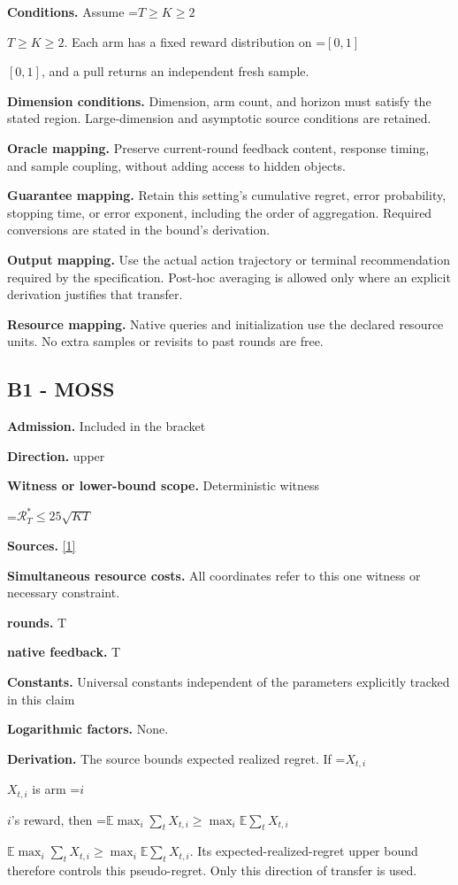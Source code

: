 \documentclass[10pt,a4paper]{article}
\newcommand{\AtlasMath}[1]{\par\begingroup\centering\setbox0=\hbox{$\displaystyle #1$}\ifdim\wd0>1.4\linewidth\typeout{ATLAS WIDE FORMULA: \the\wd0}\fi\ifdim\wd0>\linewidth\resizebox{\linewidth}{!}{\box0}\else\box0\fi\par\endgroup}
\newcommand{\AtlasInlineMath}[1]{\begingroup\setbox0=\hbox{$#1$}\ifdim\wd0>.4\linewidth\endgroup\AtlasMath{#1}\else\endgroup$#1$\fi}
\begin{document}
\textbf{Conditions.} Assume \AtlasInlineMath{T\ge K\ge2}. Each arm has a fixed reward distribution on \AtlasInlineMath{[0,1]}, and a pull returns an independent fresh sample.

\textbf{Dimension conditions.} Dimension, arm count, and horizon must satisfy the stated region. Large-dimension and asymptotic source conditions are retained.

\textbf{Oracle mapping.} Preserve current-round feedback content, response timing, and sample coupling, without adding access to hidden objects.

\textbf{Guarantee mapping.} Retain this setting's cumulative regret, error probability, stopping time, or error exponent, including the order of aggregation. Required conversions are stated in the bound's derivation.

\textbf{Output mapping.} Use the actual action trajectory or terminal recommendation required by the specification. Post-hoc averaging is allowed only where an explicit derivation justifies that transfer.

\textbf{Resource mapping.} Native queries and initialization use the declared resource units. No extra samples or revisits to past rounds are free.

\subsection{B1 - MOSS}
\textbf{Admission.} Included in the bracket

\textbf{Direction.} upper

\textbf{Witness or lower-bound scope.} Deterministic witness

\AtlasMath{\mathcal{R}_T^*\le25\sqrt{KT}}
\textbf{Sources.} \href{https://jmlr.org/papers/volume11/audibert10a/audibert10a.pdf}{[1]}

\textbf{Simultaneous resource costs.} All coordinates refer to this one witness or necessary constraint.

\textbf{rounds.} T

\textbf{native feedback.} T

\textbf{Constants.} Universal constants independent of the parameters explicitly tracked in this claim

\textbf{Logarithmic factors.} None.

\textbf{Derivation.} The source bounds expected realized regret. If \AtlasInlineMath{X_{t,i}} is arm \AtlasInlineMath{i}'s reward, then \AtlasInlineMath{\mathbb E\max_i\sum_tX_{t,i}\ge\max_i\mathbb E\sum_tX_{t,i}}. Its expected-realized-regret upper bound therefore controls this pseudo-regret. Only this direction of transfer is used.
\end{document}
